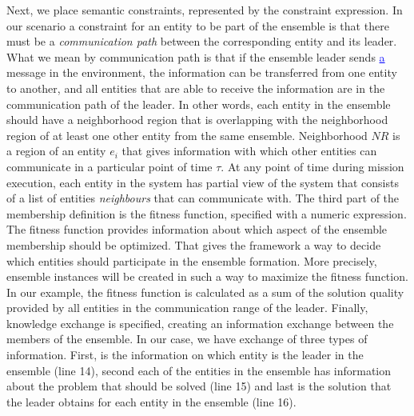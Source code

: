 \documentclass[journal]{IEEEtran}
\theoremstyle{definition}
\newcommand{\ins}[1]{\textcolor{blue}{\uline{#1}}} %
\begin{document}
Next, we place semantic constraints, represented by the constraint expression. In our scenario a constraint for an entity to be part of the ensemble is that there must be a \textit{communication path} between the corresponding entity and its leader. What we mean by communication path is that if the ensemble leader sends \ins{a} message in the environment, the information can be transferred from one entity to another, and all entities that are able to receive the information are in the communication path of the leader.
In other words, each entity in the ensemble should have a neighborhood region that is overlapping with the neighborhood region 
of at least one other entity from the same ensemble. Neighborhood $NR$ is a region of an entity $e_i$ that gives information with which other entities can communicate in a particular point of time $\tau$. At any point of time during mission execution, each entity in the system has partial view of the system that consists of a list of entities \textit{neighbours} that can communicate with. 
The third part of the membership definition is the fitness function, specified with a numeric expression. The fitness function provides information about which aspect of the ensemble membership should be optimized. That gives the framework a way to decide which entities should participate in the ensemble formation. More precisely, ensemble instances will be created in such a way to maximize the fitness function. In our example, the fitness function is calculated as a sum of the solution quality provided by all entities in the communication range of the leader. Finally, knowledge exchange is specified, creating an information exchange between the members of the ensemble. In our case, we have exchange of three types of information. First, is the information on which entity is the leader in the ensemble (line 14), second each of the entities in the ensemble has information about the problem that should be solved (line 15) and last is the solution that the leader obtains 
for each entity in the ensemble (line 16). 
\end{document}
